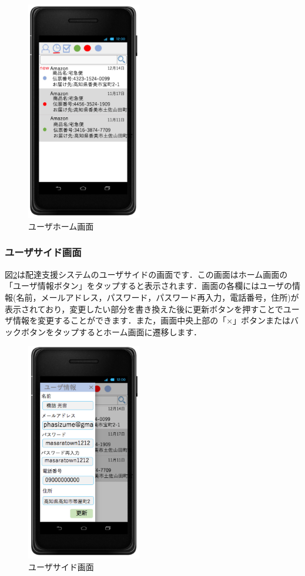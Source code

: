 \documentclass[a4j,titlepage]{jarticle}
\begin{document}
\begin{figure}[htbp]
 \begin{center}
  \includegraphics[width=50mm]{user_home}
	\caption{ユーザホーム画面}
	\label{fig:user_home}
 \end{center}

\end{figure}

\subsubsection{ユーザサイド画面}
図\ref{fig:user_side}は配達支援システムのユーザサイドの画面です．この画面はホーム画面の「ユーザ情報ボタン」をタップすると表示されます．画面の各欄にはユーザの情報(名前，メールアドレス，パスワード，パスワード再入力，電話番号，住所)が表示されており，変更したい部分を書き換えた後に更新ボタンを押すことでユーザ情報を変更することができます．また，画面中央上部の「×」ボタンまたはバックボタンをタップするとホーム画面に遷移します．

\begin{figure}[htbp]
 \begin{center}
  \includegraphics[width=50mm]{user_side}
	\caption{ユーザサイド画面}
	\label{fig:user_side}
 \end{center}

\end{figure}
\end{document}
